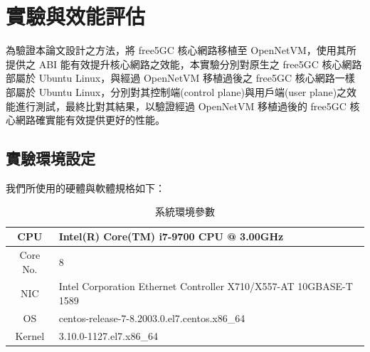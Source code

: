 \chapter{實驗與效能評估}
\label{chapter:evaluation}

為驗證本論文設計之方法，將 free5GC 核心網路移植至 OpenNetVM，使用其所提供之 ABI 能有效提升核心網路之效能，本實驗分別對原生之 free5GC 核心網路部屬於 Ubuntu Linux，與經過 OpenNetVM 移植過後之 free5GC 核心網路一樣部屬於 Ubuntu Linux，分別對其控制端(control plane)與用戶端(user plane)之效能進行測試，最終比對其結果，以驗證經過 OpenNetVM 移植過後的 free5GC 核心網路確實能有效提供更好的性能。

\section{實驗環境設定}
\label{sec:evaluation_env}

我們所使用的硬體與軟體規格如下：

\begin{table}[h!]
    \centering
    \begin{tabular}{c|l}
        \hline
        CPU & Intel(R) Core(TM) i7-9700 CPU @ 3.00GHz \\
        \hline
        Core No. & 8 \\
        \hline
        NIC & Intel Corporation Ethernet Controller X710/X557-AT 10GBASE-T 1589 \\
        \hline
        OS & centos-release-7-8.2003.0.el7.centos.x86\_64 \\
        \hline
        Kernel & 3.10.0-1127.el7.x86\_64 \\
        \hline
    \end{tabular}
    \caption[系統環境參數]{{\footnotesize 系統環境參數}}
    \label{table:sys_env}
\end{table}

